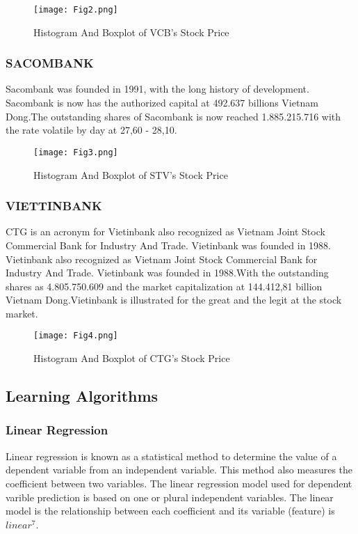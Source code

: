 \documentclass{ieeeojies}
\begin{document}
\begin{figure}[ht]
  \centering
  \texttt{[image: Fig2.png]}
  \caption{Histogram And Boxplot of VCB’s Stock Price}
  \label{fig:example}
\end{figure}
\subsubsection*{\textbf{SACOMBANK}}
Sacombank was founded in 1991, with the long history of development. Sacombank is now has the authorized capital at 492.637 billions Vietnam Dong.The outstanding shares of Sacombank is now reached 1.885.215.716 with the rate volatile by day at 27,60 - 28,10.

\begin{figure}[ht]
  \centering
  \texttt{[image: Fig3.png]}
  \caption{Histogram And Boxplot of STV’s Stock Price}
  \label{fig:example}
\end{figure}
\subsubsection*{\textbf{VIETTINBANK}}
CTG is an acronym for Vietinbank also recognized as Vietnam Joint Stock Commercial Bank for Industry And Trade. Vietinbank was founded in 1988. Vietinbank also recognized as Vietnam Joint Stock Commercial Bank for Industry And Trade. Vietinbank was founded in 1988.With the outstanding shares as 4.805.750.609 and the market capitalization at 144.412,81 billion Vietnam Dong.Vietinbank is illustrated for the great and the legit at the stock market. 

\begin{figure}[ht]
  \centering
  \texttt{[image: Fig4.png]}
  \caption{Histogram And Boxplot of CTG’s Stock Price}
  \label{fig:example}
\end{figure}

\subsection{Learning Algorithms}
\subsubsection{\textbf{Linear Regression}}
Linear regression is known as a statistical method to determine the value of a dependent variable from an independent variable. This method also measures the coefficient between two variables. The linear regression model used for dependent varible prediction is based on one or plural independent variables. The linear model is the relationship between each coefficient and its variable (feature) is $linear^{7}$.
\end{document}
